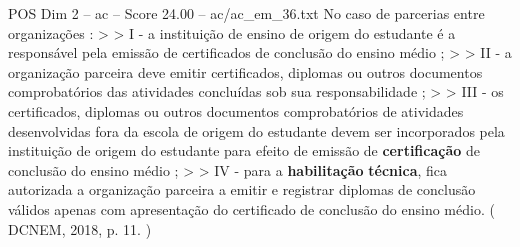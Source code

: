 \begin{textsample}{POS Dim 2 – ac – Score 24.00 – ac/ac\_em\_36.txt}
No caso de parcerias entre organizações : > > I - a instituição de ensino de origem do estudante é a responsável pela emissão de certificados de conclusão do ensino médio ; > > II - a organização parceira deve emitir certificados, diplomas ou outros documentos comprobatórios das atividades concluídas sob sua responsabilidade ; > > III - os certificados, diplomas ou outros documentos comprobatórios de atividades desenvolvidas fora da escola de origem do estudante devem ser incorporados pela instituição de origem do estudante para efeito de emissão de \textbf{certificação} de conclusão do ensino médio ; > > IV - para a \textbf{habilitação} \textbf{técnica}, fica autorizada a organização parceira a emitir e registrar diplomas de conclusão válidos apenas com apresentação do certificado de conclusão do ensino médio. ( DCNEM, 2018, p. 11. )

\end{textsample}
